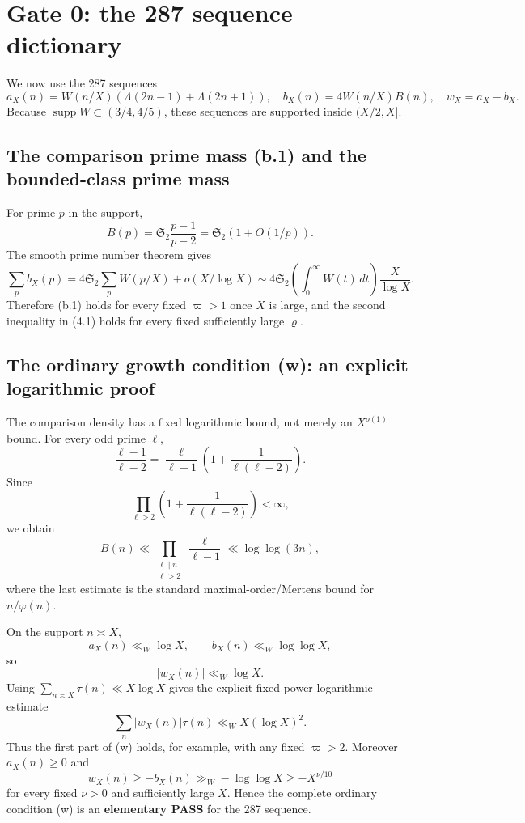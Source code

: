 \documentclass[11pt]{article}
\theoremstyle{definition}
\theoremstyle{remark}
\newcommand{\1}{\mathbf 1}
\begin{document}
\section{Gate 0: the 287 sequence dictionary}

We now use the 287 sequences
\[
 a_X(n)=W(n/X)(\Lambda(2n-1)+\Lambda(2n+1)),\quad
 b_X(n)=4W(n/X)B(n),\quad w_X=a_X-b_X.
\]
Because $\operatorname{supp}W\subset(3/4,4/5)$, these sequences are supported inside $(X/2,X]$.

\subsection{The comparison prime mass (b.1) and the bounded-class prime mass}

For prime $p$ in the support,
\[
 B(p)=\mathfrak S_2\frac{p-1}{p-2}=\mathfrak S_2(1+O(1/p)).
\]
The smooth prime number theorem gives
\[
 \sum_p b_X(p)
 =4\mathfrak S_2\sum_p W(p/X)+o(X/\log X)
 \sim 4\mathfrak S_2\left(\int_0^\infty W(t)\,dt\right)\frac X{\log X}.
\tag{G0-b1}
\]
Therefore (b.1) holds for every fixed $\varpi>1$ once $X$ is large, and the second inequality in (4.1) holds
for every fixed sufficiently large $\varrho$.

\subsection{The ordinary growth condition (w): an explicit logarithmic proof}

The comparison density has a fixed logarithmic bound, not merely an $X^{o(1)}$ bound.
For every odd prime $\ell$,
\[
 \frac{\ell-1}{\ell-2}
 =\frac{\ell}{\ell-1}
 \left(1+\frac{1}{\ell(\ell-2)}\right).
\]
Since
\[
 \prod_{\ell>2}\left(1+\frac{1}{\ell(\ell-2)}\right)<\infty,
\]
we obtain
\[
 B(n)\ll \prod_{\substack{\ell\mid n\\\ell>2}}\frac{\ell}{\ell-1}
 \ll \log\log(3n),
\tag{G0-Bpoint}
\]
where the last estimate is the standard maximal-order/Mertens bound for $n/\varphi(n)$.

On the support $n\asymp X$,
\[
 a_X(n)\ll_W\log X,\qquad b_X(n)\ll_W\log\log X,
\]
so
\[
 |w_X(n)|\ll_W\log X.
\]
Using $\sum_{n\asymp X}\tau(n)\ll X\log X$ gives the explicit fixed-power logarithmic estimate
\[
 \boxed{\sum_n|w_X(n)|\tau(n)\ll_W X(\log X)^2.}
\tag{G0-w1}
\]
Thus the first part of (w) holds, for example, with any fixed $\varpi>2$.
Moreover $a_X(n)\ge0$ and
\[
 w_X(n)\ge-b_X(n)\gg_W-\log\log X\ge-X^{\nu/10}
\]
for every fixed $\nu>0$ and sufficiently large $X$.  Hence the complete ordinary condition (w) is an
\textbf{elementary PASS} for the 287 sequence.
\end{document}
